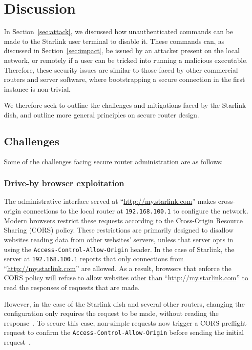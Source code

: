 \section{Discussion}\label{sec:discussion}

In Section~\ref{sec:attack}, we discussed how unauthenticated commands can be made to the Starlink user terminal to disable it.
These commands can, as discussed in Section~\ref{sec:impact}, be issued by an attacker present on the local network, or remotely if a user can be tricked into running a malicious executable.
Therefore, these security issues are similar to those faced by other commercial routers and server software, where bootstrapping a secure connection in the first instance is non-trivial.

We therefore seek to outline the challenges and mitigations faced by the Starlink dish, and outline more general principles on secure router design.

\subsection{Challenges}

Some of the challenges facing secure router administration are as follows:

\subsubsection{Drive-by browser exploitation}

The administrative interface served at ``\url{http://my.starlink.com}'' makes cross-origin connections to the local router at \texttt{192.168.100.1} to configure the network.
Modern browsers restrict these requests according to the Cross-Origin Resource Sharing (CORS) policy.
These restrictions are primarily designed to disallow websites reading data from other websites' servers, unless that server opts in using the \texttt{Access-Control-Allow-Origin} header.
In the case of Starlink, the server at \texttt{192.168.100.1} reports that only connections from ``\url{http://my.starlink.com}'' are allowed.
As a result, browsers that enforce the CORS policy will refuse to allow websites other than ``\url{http://my.starlink.com}'' to read the responses of requests that are made.

However, in the case of the Starlink dish and several other routers, changing the configuration only requires the request to be made, without reading the response~\cite{drive_by_pharming}.
To secure this case, non-simple requests now trigger a CORS preflight request to confirm the \texttt{Access-Control-Allow-Origin} before sending the initial request~\cite{simple_requests, preflight_request}.

